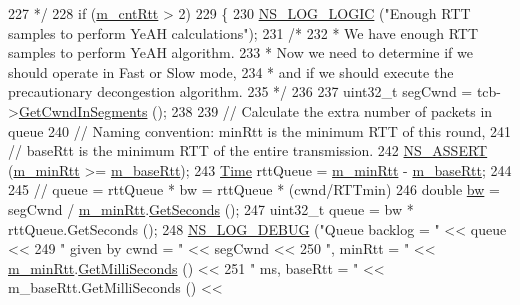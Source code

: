\begin{DoxyCode}
227 \textcolor{comment}{       */}
228       \textcolor{keywordflow}{if} (\hyperlink{classns3_1_1TcpYeah_a3040af9006b6237f1c5aa012aba3858a}{m\_cntRtt} > 2)
229         \{
230           \hyperlink{group__logging_ga88acd260151caf2db9c0fc84997f45ce}{NS\_LOG\_LOGIC} (\textcolor{stringliteral}{"Enough RTT samples to perform YeAH calculations"});
231           \textcolor{comment}{/*}
232 \textcolor{comment}{           * We have enough RTT samples to perform YeAH algorithm.}
233 \textcolor{comment}{           * Now we need to determine if we should operate in Fast or Slow mode,}
234 \textcolor{comment}{           * and if we should execute the precautionary decongestion algorithm.}
235 \textcolor{comment}{           */}
236 
237           uint32\_t segCwnd = tcb->\hyperlink{classns3_1_1TcpSocketState_ab6dfe309ca53fd3207dcafede75ad12d}{GetCwndInSegments} ();
238 
239           \textcolor{comment}{// Calculate the extra number of packets in queue}
240           \textcolor{comment}{// Naming convention: minRtt is the minimum RTT of this round,}
241           \textcolor{comment}{// baseRtt is the minimum RTT of the entire transmission.}
242           \hyperlink{assert_8h_a6dccdb0de9b252f60088ce281c49d052}{NS\_ASSERT} (\hyperlink{classns3_1_1TcpYeah_a03797ee01437476f042a2532916eeb34}{m\_minRtt} >= \hyperlink{classns3_1_1TcpYeah_ae5be5385c3024374ff24843e70cde080}{m\_baseRtt});
243           \hyperlink{namespacens3_1_1TracedValueCallback_a7ffd3e7c142ffe7c8a1d2db9b8de38ec}{Time} rttQueue =  \hyperlink{classns3_1_1TcpYeah_a03797ee01437476f042a2532916eeb34}{m\_minRtt} - \hyperlink{classns3_1_1TcpYeah_ae5be5385c3024374ff24843e70cde080}{m\_baseRtt};
244 
245           \textcolor{comment}{// queue = rttQueue * bw = rttQueue * (cwnd/RTTmin)}
246           \textcolor{keywordtype}{double} \hyperlink{generate__test__data__lte__spectrum__model_8m_a3f7228a3941f19f282647a09dd494528}{bw} = segCwnd / \hyperlink{classns3_1_1TcpYeah_a03797ee01437476f042a2532916eeb34}{m\_minRtt}.\hyperlink{classns3_1_1Time_a8f20d5c3b0902d7b4320982f340b57c8}{GetSeconds} ();
247           uint32\_t queue = bw * rttQueue.GetSeconds ();
248           \hyperlink{group__logging_ga413f1886406d49f59a6a0a89b77b4d0a}{NS\_LOG\_DEBUG} (\textcolor{stringliteral}{"Queue backlog = "} << queue <<
249                         \textcolor{stringliteral}{" given by cwnd = "} << segCwnd <<
250                         \textcolor{stringliteral}{", minRtt = "} << \hyperlink{classns3_1_1TcpYeah_a03797ee01437476f042a2532916eeb34}{m\_minRtt}.\hyperlink{classns3_1_1Time_aba3428a8b6c4c8d9014ce44145081f34}{GetMilliSeconds} () <<
251                         \textcolor{stringliteral}{" ms, baseRtt = "} << m\_baseRtt.GetMilliSeconds () <<

\end{DoxyCode}
